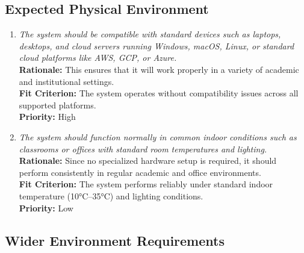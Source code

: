 \documentclass[12pt]{article}
\begin{document}
\subsection{Expected Physical Environment}

\begin{enumerate}[label=OER-EP\arabic*., wide=0pt, leftmargin=*]
  \item \emph{The system should be compatible with standard devices such as laptops, desktops, and cloud servers running Windows, macOS, Linux, or standard cloud platforms like AWS, GCP, or Azure.}\\[2mm]
    {\bf Rationale:} This ensures that it will work properly in a variety of academic and institutional settings.\\
    {\bf Fit Criterion:} The system operates without compatibility issues across all supported platforms.\\
    {\bf Priority:} High

  \item \emph{The system should function normally in common indoor conditions such as classrooms or offices with standard room temperatures and lighting.}\\[2mm]
    {\bf Rationale:} Since no specialized hardware setup is required, it should perform consistently in regular academic and office environments.\\
    {\bf Fit Criterion:} The system performs reliably under standard indoor temperature (10°C–35°C) and lighting conditions.\\
    {\bf Priority:} Low
\end{enumerate}

\subsection{Wider Environment Requirements}
\end{document}
